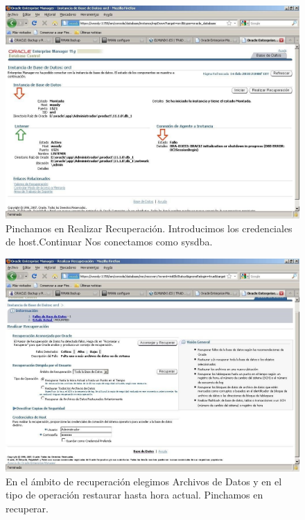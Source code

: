 \begin{figure}[h]
\includegraphics[width=1\textwidth]{../images/backupEM-9.jpg}
\caption{Pinchamos en Realizar Recuperación. Introducimos los credenciales de host.Continuar Nos conectamos como sysdba.}
\label{fig:backup9}
\end{figure}

\begin{figure}[h]
\includegraphics[width=1\textwidth]{../images/backupEM-10.jpg}
\caption{En el ámbito de recuperación elegimos Archivos de Datos y en el tipo de operación restaurar hasta hora actual. Pinchamos en recuperar.}
\label{fig:backup10}
\end{figure}



